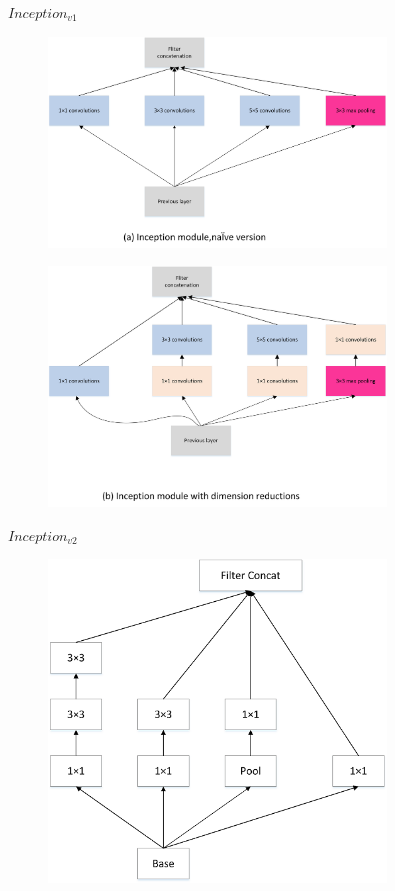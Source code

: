 \(Inception_{v1}\)

\begin{figure}
\centering
\includegraphics[width=0.8\textwidth]{./img/ch4/image27.png}
\caption{}
\end{figure}

\begin{figure}
\centering
\includegraphics[width=0.8\textwidth]{./img/ch4/image28.png}
\caption{}
\end{figure}

\(Inception_{v2}\)

\begin{figure}
\centering
\includegraphics[width=0.8\textwidth]{./img/ch4/image34.png}
\caption{}
\end{figure}

